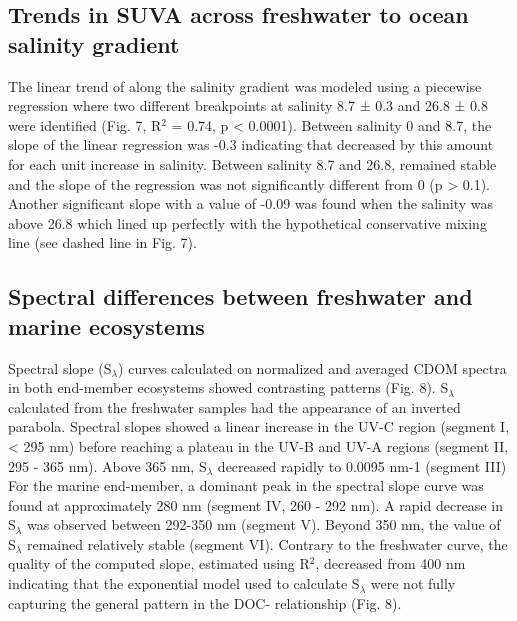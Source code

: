 \subsection*{Trends in SUVA across freshwater to ocean salinity gradient}

The linear trend of  along the salinity gradient was modeled using a piecewise regression where two different breakpoints at salinity 8.7 ± 0.3 and 26.8 ± 0.8 were identified (Fig. 7, R$^2$ = 0.74, p < 0.0001). Between salinity 0 and 8.7, the slope of the linear regression was -0.3 indicating that  decreased by this amount for each unit increase in salinity. Between salinity 8.7 and 26.8,  remained stable and the slope of the regression was not significantly different from 0 (p > 0.1). Another significant slope with a value of -0.09 was found when the salinity was above 26.8 which lined up perfectly with the hypothetical conservative mixing line (see dashed line in Fig. 7).

\subsection*{Spectral differences between freshwater and marine ecosystems}

Spectral slope (S$_\lambda$) curves calculated on normalized and averaged CDOM spectra in both end-member ecosystems showed contrasting patterns (Fig. 8). S$_\lambda$ calculated from the freshwater samples had the appearance of an inverted parabola. Spectral slopes showed a linear increase in the UV-C region (segment I, < 295 nm) before reaching a plateau in the UV-B and UV-A regions (segment II, 295 - 365 nm). Above 365 nm, S$_\lambda$ decreased rapidly to 0.0095 nm-1 (segment III) For the marine end-member, a dominant peak in the spectral slope curve was found at approximately 280 nm (segment IV, 260 - 292 nm). A rapid decrease in S$_\lambda$ was observed between 292-350 nm (segment V). Beyond 350 nm, the value of S$_\lambda$ remained relatively stable (segment VI). Contrary to the freshwater curve, the quality of the computed slope, estimated using R$^2$, decreased from 400 nm indicating that the exponential model used to calculate S$_\lambda$ were not fully capturing the general pattern in the DOC-\acdom{\lambda} relationship (Fig. 8).
